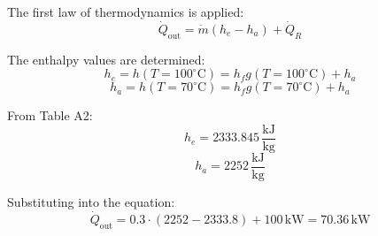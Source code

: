 The first law of thermodynamics is applied:  
\[
\dot{Q}_{\text{out}} = \dot{m} (h_e - h_a) + \dot{Q}_R
\]  

The enthalpy values are determined:  
\[
h_e = h(T = 100^\circ\text{C}) = h_fg(T = 100^\circ\text{C}) + h_a
\]  
\[
h_a = h(T = 70^\circ\text{C}) = h_fg(T = 70^\circ\text{C}) + h_a
\]  

From Table A2:  
\[
h_e = 2333.845 \, \frac{\text{kJ}}{\text{kg}}
\]  
\[
h_a = 2252 \, \frac{\text{kJ}}{\text{kg}}
\]  

Substituting into the equation:  
\[
\dot{Q}_{\text{out}} = 0.3 \cdot (2252 - 2333.8) + 100 \, \text{kW} = 70.36 \, \text{kW}
\]